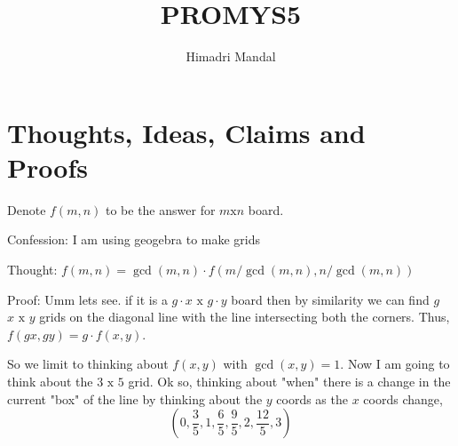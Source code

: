 \documentclass[11pt]{scrartcl}
\title{PROMYS5}
\author{Himadri Mandal}
\begin{document}
\maketitle

\section{Thoughts, Ideas, Claims and Proofs}
Denote $f(m,n)$ to be the answer for $m \text{x} n$ board.

Confession: I am using geogebra to make grids

Thought: $f(m, n) = \gcd(m,n) \cdot f(m/\gcd(m,n), n/\gcd(m,n))$

Proof: Umm lets see. if it is a $g \cdot x \text{ x } g \cdot y$ board then 
by similarity we can find $g$ $x \text{ x } y$ grids on the diagonal line with 
the line intersecting both the corners. Thus, $f(gx, gy) = g \cdot f(x,y)$. 

So we limit to thinking about $f(x,y)$ with $\gcd(x,y) = 1$. Now I am going to think
about the $3 \text{ x } 5$ grid. Ok so, thinking about "when" there is a change in the 
current "box" of the line by thinking about the $y$ coords
as the $x$ coords change, 
$$(0, \frac35, 1, \frac65, \frac95, 2,\frac{12}5, 3)$$
\end{document}
